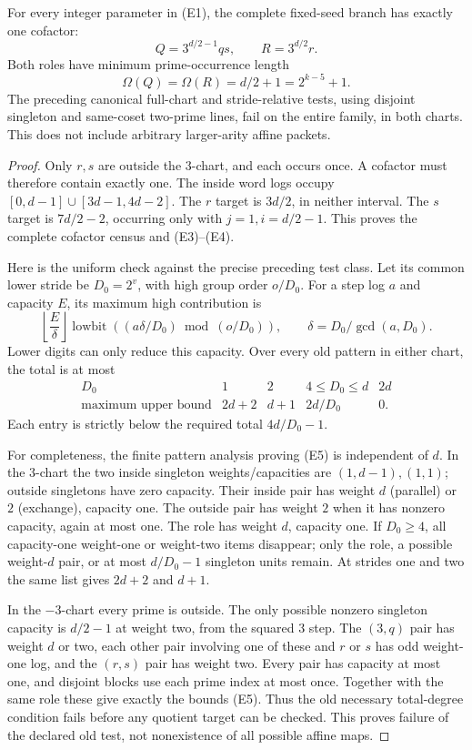 \begin{theorem}
For every integer parameter in (E1), the complete fixed-seed branch has exactly
one cofactor:
\[
 \boxed{Q=3^{d/2-1}qs,\qquad R=3^{d/2}r.}                 \tag{E3}
\]
Both roles have minimum prime-occurrence length
\[
 \boxed{\Omega(Q)=\Omega(R)=d/2+1=2^{k-5}+1.}              \tag{E4}
\]
The preceding canonical full-chart and stride-relative tests, using disjoint
singleton and same-coset two-prime lines, fail on the entire family, in both
charts. This does not include arbitrary larger-arity affine packets.
\end{theorem}
\begin{proof}
Only $r,s$ are outside the $3$-chart, and each occurs once. A cofactor must
therefore contain exactly one. The inside word logs occupy
$[0,d-1]\cup[3d-1,4d-2]$. The $r$ target is $3d/2$, in neither interval.
The $s$ target is $7d/2-2$, occurring only with $j=1,i=d/2-1$.
This proves the complete cofactor census and (E3)--(E4).

Here is the uniform check against the precise preceding test class. Let its
common lower stride be $D_0=2^v$, with high group order $o/D_0$. For a step
log $a$ and capacity $E$, its maximum high contribution is
\[
 \left\lfloor\frac{E}{\delta}\right\rfloor
 \operatorname{lowbit}\left((a\delta/D_0)\bmod(o/D_0)\right),
 \qquad\delta=D_0/\gcd(a,D_0).
\]
Lower digits can only reduce this capacity. Over every old pattern in either
chart, the total is at most
\[
 \begin{array}{c|cccc}
 D_0&1&2&4\le D_0\le d&2d\\\hline
 \text{maximum upper bound}&2d+2&d+1&2d/D_0&0.
 \end{array}                                               \tag{E5}
\]
Each entry is strictly below the required total $4d/D_0-1$.

For completeness, the finite pattern analysis proving (E5) is independent of
$d$. In the $3$-chart the two inside singleton weights/capacities are
$(1,d-1),(1,1)$; outside singletons have zero capacity. Their inside pair has
weight $d$ (parallel) or $2$ (exchange), capacity one. The outside pair has
weight $2$ when it has nonzero capacity, again at most one. The role has
weight $d$, capacity one. If $D_0\ge4$, all capacity-one weight-one or
weight-two items disappear; only the role, a possible weight-$d$ pair, or
at most $d/D_0-1$ singleton units remain. At strides one and two the same
list gives $2d+2$ and $d+1$.

In the $-3$-chart every prime is outside. The only possible nonzero singleton
capacity is $d/2-1$ at weight two, from the squared $3$ step. The $(3,q)$ pair
has weight $d$ or two, each other pair involving one of these and $r$ or $s$
has odd weight-one log, and the $(r,s)$ pair has weight two. Every pair has
capacity at most one, and disjoint blocks use each prime index at most once.
Together with the same role these give exactly the bounds (E5).
Thus the old necessary total-degree condition fails before any quotient target
can be checked. This proves failure of the declared old test, not nonexistence
of all possible affine maps.
\end{proof}

